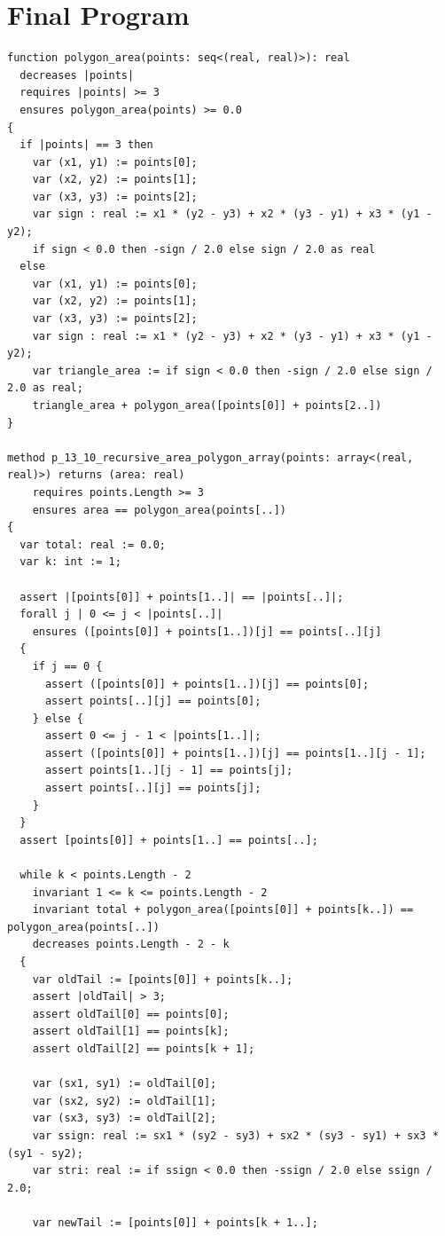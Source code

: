 \documentclass{article}
\begin{document}
\section*{Final Program}
\begin{lstlisting}
function polygon_area(points: seq<(real, real)>): real
  decreases |points|
  requires |points| >= 3
  ensures polygon_area(points) >= 0.0
{
  if |points| == 3 then 
    var (x1, y1) := points[0];
    var (x2, y2) := points[1];
    var (x3, y3) := points[2];
    var sign : real := x1 * (y2 - y3) + x2 * (y3 - y1) + x3 * (y1 - y2);
    if sign < 0.0 then -sign / 2.0 else sign / 2.0 as real 
  else 
    var (x1, y1) := points[0];
    var (x2, y2) := points[1];
    var (x3, y3) := points[2];
    var sign : real := x1 * (y2 - y3) + x2 * (y3 - y1) + x3 * (y1 - y2);
    var triangle_area := if sign < 0.0 then -sign / 2.0 else sign / 2.0 as real;
    triangle_area + polygon_area([points[0]] + points[2..])
}

method p_13_10_recursive_area_polygon_array(points: array<(real, real)>) returns (area: real)
	requires points.Length >= 3
	ensures area == polygon_area(points[..])
{
  var total: real := 0.0;
  var k: int := 1;

  assert |[points[0]] + points[1..]| == |points[..]|;
  forall j | 0 <= j < |points[..]|
    ensures ([points[0]] + points[1..])[j] == points[..][j]
  {
    if j == 0 {
      assert ([points[0]] + points[1..])[j] == points[0];
      assert points[..][j] == points[0];
    } else {
      assert 0 <= j - 1 < |points[1..]|;
      assert ([points[0]] + points[1..])[j] == points[1..][j - 1];
      assert points[1..][j - 1] == points[j];
      assert points[..][j] == points[j];
    }
  }
  assert [points[0]] + points[1..] == points[..];

  while k < points.Length - 2
    invariant 1 <= k <= points.Length - 2
    invariant total + polygon_area([points[0]] + points[k..]) == polygon_area(points[..])
    decreases points.Length - 2 - k
  {
    var oldTail := [points[0]] + points[k..];
    assert |oldTail| > 3;
    assert oldTail[0] == points[0];
    assert oldTail[1] == points[k];
    assert oldTail[2] == points[k + 1];

    var (sx1, sy1) := oldTail[0];
    var (sx2, sy2) := oldTail[1];
    var (sx3, sy3) := oldTail[2];
    var ssign: real := sx1 * (sy2 - sy3) + sx2 * (sy3 - sy1) + sx3 * (sy1 - sy2);
    var stri: real := if ssign < 0.0 then -ssign / 2.0 else ssign / 2.0;

    var newTail := [points[0]] + points[k + 1..];


\end{lstlisting}
\end{document}
